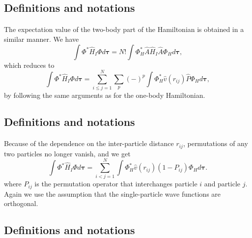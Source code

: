 \documentclass[%
twoside,                 %
final,                   %
10pt]{article}
\begin{document}
\subsection*{Definitions and notations}

\paragraph{}
The expectation value of the two-body part of the Hamiltonian is obtained in a
similar manner. We have
\[
  \int \Phi^*\hat{H}_I\Phi d\mathbf{\tau} 
  = N! \int \Phi_H^*\hat{A}\hat{H}_I\hat{A}\Phi_H d\mathbf{\tau},
\]
which reduces to
\[
 \int \Phi^*\hat{H}_I\Phi d\mathbf{\tau} 
  = \sum_{i\le j=1}^N \sum_{p} (-)^p\int 
  \Phi_H^*\hat{v}(r_{ij})\hat{P}\Phi_H d\mathbf{\tau},
\]
by following the same arguments as for the one-body
Hamiltonian.



\subsection*{Definitions and notations}

\paragraph{}
Because of the dependence on the inter-particle distance $r_{ij}$,  permutations of
any two particles no longer vanish, and we get
\[
  \int \Phi^*\hat{H}_I\Phi d\mathbf{\tau} 
  = \sum_{i < j=1}^N \int  
  \Phi_H^*\hat{v}(r_{ij})(1-P_{ij})\Phi_H d\mathbf{\tau}.
\]
where $P_{ij}$ is the permutation operator that interchanges
particle $i$ and particle $j$. Again we use the assumption that the single-particle wave functions
are orthogonal.




\subsection*{Definitions and notations}

\end{document}

